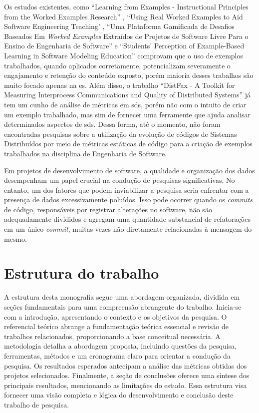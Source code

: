 Os estudos existentes, como ``Learning from Examples - Instructional Principles from the Worked Examples Research'' \cite{Robert.Atkinson-etal:2000}, ``Using Real Worked Examples to Aid Software Engineering Teaching' \cite{Simone.Tonhao-etal:2021}, ``Uma Plataforma Gamificada de Desafios Baseados Em \textit{Worked Examples} Extraídos de Projetos de Software Livre Para o Ensino de Engenharia de Software'' \cite{Simone.Tonhao-etal:2022} e ``Students' Perception of Example-Based Learning in Software Modeling Education'' \cite{Tiago.Bonetti-etal:2023} comprovam que o uso de exemplos trabalhados, quando aplicados corretamente, potencializam severamente o engajamento e retenção do conteúdo exposto, porém maioria desses trabalhos são muito focado apenas na \gls{es}. Além disso, o trabalho ``DistFax - A Toolkit for Measuring Interprocess Communications and Quality of Distributed Systems''\cite{DistFax} já tem um cunho de análise de métricas em \gls{sds}, porém não com o intuito de criar um exemplo trabalhado, mas sim de fornecer uma ferramente que ajuda analisar determinados aspectos de \gls{sds}. Dessa forma, até o momento, não foram encontradas pesquisas sobre a utilização da evolução de códigos de Sistemas Distribuídos por meio de métricas estáticas de código para a criação de exemplos trabalhados na disciplina de Engenharia de Software.

Em projetos de desenvolvimento de software, a qualidade e organização dos dados desempenham um papel crucial na condução de pesquisas significativas. No entanto, um dos fatores que podem inviabilizar a pesquisa seria enfrentar com a presença de dados excessivamente poluídos. Isso pode ocorrer quando os \textit{commits} de código, responsáveis por registrar alterações no software, não são adequadamente divididos e agregam uma quantidade substancial de refatorações em um único \textit{commit}, muitas vezes não diretamente relacionadas à mensagem do mesmo.

\section{Estrutura do trabalho}
\label{sec:estruturaTrabalho}

A estrutura desta monografia segue uma abordagem organizada, dividida em seções fundamentais para uma compreensão abrangente do trabalho. Inicia-se com a introdução, apresentando o contexto e os objetivos da pesquisa. O referencial teórico abrange a fundamentação teórica essencial e revisão de trabalhos relacionados, proporcionando a base conceitual necessária. A metodologia detalha a abordagem proposta, incluindo questões da pesquisa, ferramentas, métodos e um cronograma claro para orientar a condução da pesquisa. Os resultados esperados antecipam a análise das métricas obtidas dos projetos selecionados. Finalmente, a seção de conclusões oferece uma síntese dos principais resultados, mencionando as limitações do estudo. Essa estrutura visa fornecer uma visão completa e lógica do desenvolvimento e conclusão deste trabalho de pesquisa.
